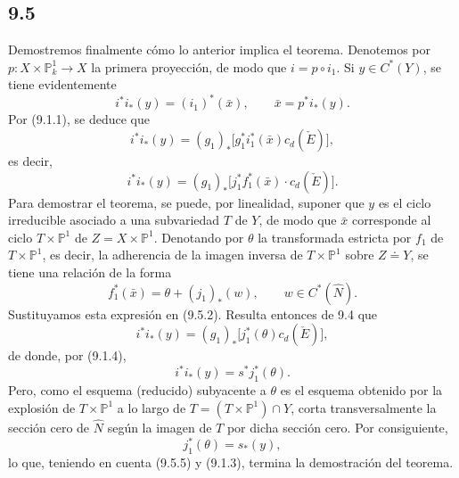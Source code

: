 \subsection*{9.5}

Demostremos finalmente cómo lo anterior implica el teorema. Denotemos por $p:X\times\mathbb P^1_k\to X$ la primera proyección, de modo que $i=p\circ i_1$. Si $y\in C^*(Y)$, se tiene evidentemente
\[
i^*i_*(y)=(i_1)^*(\bar x),\qquad \bar x=p^*i_*(y).
\tag{9.5.1}
\]
Por (9.1.1), se deduce que
\[
i^*i_*(y)=(g_1)_*\bigl[g_1^*i_1^*(\bar x)c_d(\check E)\bigr],
\]
es decir,
\[
i^*i_*(y)=(g_1)_*\bigl[j_1^*f_1^*(\bar x)\cdot c_d(\check E)\bigr].
\tag{9.5.2}
\]
Para demostrar el teorema, se puede, por linealidad, suponer que $y$ es el ciclo irreducible asociado a una subvariedad $T$ de $Y$, de modo que $\bar x$ corresponde al ciclo $T\times\mathbb P^1$ de $Z=X\times\mathbb P^1$. Denotando por $\theta$ la transformada estricta por $f_1$ de $T\times\mathbb P^1$, es decir, la adherencia de la imagen inversa de $T\times\mathbb P^1$ sobre $Z\doteq Y$, se tiene una relación de la forma
\[
f_1^*(\bar x)=\theta+(j_1)_*(w),\qquad w\in C^*(\widehat N).
\tag{9.5.3}
\]
Sustituyamos esta expresión en (9.5.2). Resulta entonces de 9.4 que
\[
i^*i_*(y)=(g_1)_*\bigl[j_1^*(\theta)c_d(\check E)\bigr],
\tag{9.5.4}
\]
de donde, por (9.1.4),
\[
i^*i_*(y)=s^*j_1^*(\theta).
\tag{9.5.5}
\]
Pero, como el esquema (reducido) subyacente a $\theta$ es el esquema obtenido por la explosión de $T\times\mathbb P^1$ a lo largo de $T=(T\times\mathbb P^1)\cap Y$, corta transversalmente la sección cero de $\widehat N$ según la imagen de $T$ por dicha sección cero. Por consiguiente,
\[
j_1^*(\theta)=s_*(y),
\]
lo que, teniendo en cuenta (9.5.5) y (9.1.3), termina la demostración del teorema.
